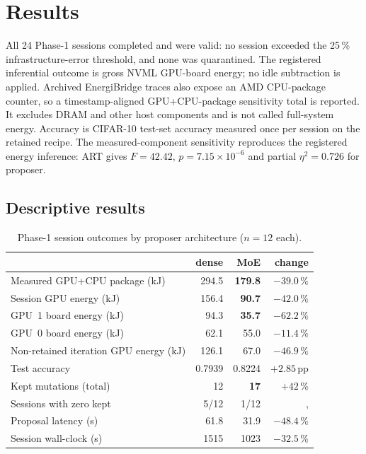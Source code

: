 \section{Results}\label{sec:results}

All 24 Phase-1 sessions completed and were valid: no session exceeded the 25\,\%
infrastructure-error threshold, and none was quarantined. The registered
inferential outcome is gross NVML GPU-board energy; no idle subtraction is
applied. Archived EnergiBridge traces also expose an AMD CPU-package counter, so
a timestamp-aligned GPU+CPU-package sensitivity total is reported. It excludes
DRAM and other host components and is not called full-system energy. Accuracy is
CIFAR-10 test-set accuracy measured once per session on the retained recipe.
The measured-component sensitivity reproduces the registered energy inference:
ART gives $F=42.42$, $p=7.15\times10^{-6}$ and partial $\eta^2=0.726$ for proposer.

\subsection{Descriptive results}

\begin{table}[htbp]
\centering
\caption{Phase-1 session outcomes by proposer architecture ($n=12$ each).}
\label{tab:headline}
\small
\begin{tabular}{p{3.0cm}rrr}
\toprule
& dense & MoE & change \\
\midrule
Measured GPU+CPU package (kJ)& 294.5 & \textbf{179.8} & $-39.0\,\%$ \\
Session GPU energy (kJ)      & 156.4 & \textbf{90.7} & $-42.0\,\%$ \\
GPU~1 board energy (kJ)      &  94.3 & \textbf{35.7} & $-62.2\,\%$ \\
GPU~0 board energy (kJ)      &  62.1 & 55.0 & $-11.4\,\%$ \\
Non-retained iteration GPU energy (kJ) & 126.1 & 67.0 & $-46.9\,\%$ \\
Test accuracy                & 0.7939 & 0.8224 & $+2.85$\,pp \\
Kept mutations (total)       & 12 & \textbf{17} & $+42\,\%$ \\
Sessions with zero kept      & 5/12 & 1/12 &, \\
Proposal latency (s)         & 61.8 & 31.9 & $-48.4\,\%$ \\
Session wall-clock (s)       & 1515 & 1023 & $-32.5\,\%$ \\
\bottomrule
\end{tabular}
\end{table}

